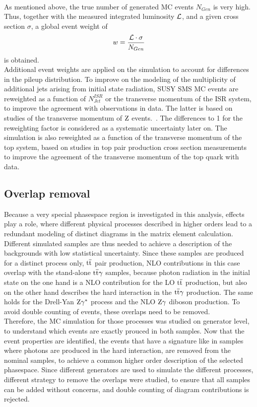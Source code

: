 \\
As mentioned above, the true number of generated MC events $N_{Gen}$ is very high. Thus, together with the measured integrated luminosity $\mathcal{L}$, and a given cross section $\sigma$, a global event weight of
\begin{equation}
 w = \frac{\mathcal{L} \cdot \sigma}{N_{Gen}}
\end{equation}
is obtained.\\
Additional event weights are applied on the simulation to account for differences in the pileup distribution. To improve on the \MADGRAPH modeling of the multiplicity of additional jets arising from initial state radiation, SUSY SMS MC events are reweighted as a function of $N^{ISR}_{Jet}$ or the transverse momentum of the ISR system, to improve the agreement with observations in data.
The latter is based on studies of the transverse momentum of $\mathrm{Z}$ events.~\cite{NISRweight}.
The differences to 1 for the reweighting factor is considered as a systematic uncertainty later on.
The \POWHEG \ttbar simulation is also reweighted as a function of the transverse momentum of the top system, based on studies in top pair production cross section measurements~\cite{topWeight1,topWeight2,topWeight3,topWeight4} to improve the agreement of the transverse momentum of the top quark with data.

\subsection*{Overlap removal}\label{sec:overlap}

Because a very special phasespace region is investigated in this analysis, effects play a role, where different physical processes described in higher orders lead to a redundant modeling of distinct diagrams in the matrix element calculation. Different simulated samples are thus needed to achieve a description of the backgrounds with low statistical uncertainty. Since these samples are produced for a distinct process only, \eg ${\mathrm{t}\overline{\mathrm{t}}}$ pair production, NLO contributions in this case overlap with the stand-alone ${\mathrm{t}\overline{\mathrm{t}}}\gamma$ samples, because photon radiation in the initial state on the one hand is a NLO contribution for the LO ${\mathrm{t}\overline{\mathrm{t}}}$ production, but also on the other hand describes the hard interaction in the ${\mathrm{t}\overline{\mathrm{t}}}\gamma$ production. The same holds for the Drell-Yan $\mathrm{Z}\gamma^{*}$ process and the NLO $\mathrm{Z}\gamma$ diboson production. To avoid double counting of events, these overlaps need to be removed.\\
Therefore, the MC simulation for those processes was studied on generator level, to understand which events are exactly prouced in both samples. Now that the event properties are identified, the events that have a signature like in samples where photons are produced in the hard interaction, are removed from the nominal samples, to achieve a common higher order description of the selected phasespace. Since different generators are used to simulate the different processes, different strategy to remove the overlaps were studied, to ensure that all samples can be added without concerns, and double counting of diagram contributions is rejected.


